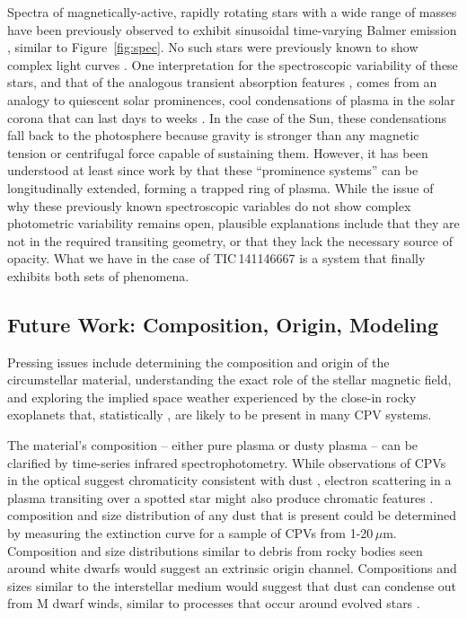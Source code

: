 \documentclass[11pt,twocolumn,tighten]{aastex7}
\begin{document}
Spectra of magnetically-active, rapidly rotating stars with a wide
range of masses have been previously observed to exhibit sinusoidal
time-varying Balmer emission
\citep{Donati2000,Townsend2005b,Dunstone2006,Skelly2008}, similar to
Figure~\ref{fig:spec}.  No such stars were previously known to show
complex light curves \citep{Bouma2024}.   One interpretation for the
spectroscopic variability of these stars, and that of the analogous
transient absorption features
\citep{CollierCameron1989,CollierCameron1992,Cang2020}, comes from an
analogy to quiescent solar prominences, cool condensations of plasma
in the solar corona that can last days to weeks
\citep{VialEngvold2015}.  In the case of the Sun, these condensations
fall back to the photosphere because gravity is stronger than any
magnetic tension or centrifugal force capable of sustaining them.
However, it has been understood at least since work by
\citet{Donati2000} that these ``prominence systems'' can be
longitudinally extended, forming a trapped ring of plasma.  While the
issue of why these previously known spectroscopic variables do not
show complex photometric variability remains open, plausible
explanations include that they are not in the required transiting
geometry, or that they lack the necessary source of opacity.  What we
have in the case of TIC\,141146667 is a system that finally exhibits
both sets of phenomena.


\subsection{Future Work: Composition, Origin, Modeling}

Pressing issues include determining the composition and origin of the
circumstellar material, understanding the exact role of the stellar
magnetic field, and exploring the implied space weather experienced by
the close-in rocky exoplanets that, statistically \citep{Dressing2015},
are likely to be present in many CPV systems.

The material's composition -- either pure plasma or dusty plasma --
can be clarified by time-series infrared spectrophotometry.  While
observations of CPVs in the optical suggest chromaticity consistent
with dust \citep{Tanimoto2020,Gunther2022,Koen2023}, electron
scattering in a plasma transiting over a spotted star might
also produce chromatic features \citep{Rackham2018}.   composition and
size distribution of any dust that is present could be determined by
measuring the extinction curve for a sample of CPVs from 1-20\,$\mu$m.
Composition and size distributions similar to debris from rocky bodies
seen around white dwarfs \citep{Reach2009} would suggest an extrinsic
origin channel.  Compositions and sizes similar to the interstellar
medium would suggest that dust can condense out from M dwarf winds,
similar to processes that occur around evolved stars
\citep{Marigo2008}.
\end{document}

